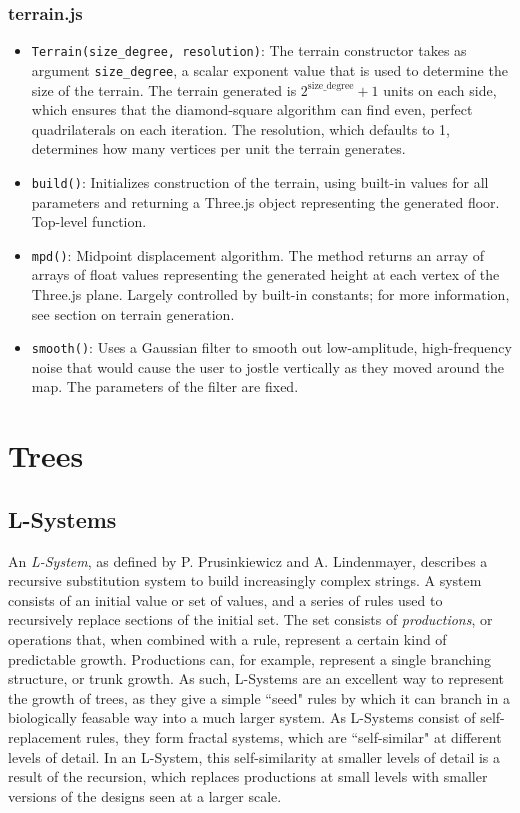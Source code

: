 \documentclass{article}
\newcommand{\tab}{\hspace*{2em}}
\begin{document}
            \subsubsection{terrain.js}
\begin{itemize}
    \item \verb|Terrain(size_degree, resolution)|: The terrain constructor takes as argument
\verb|size_degree|, a scalar exponent value that is used to determine the size of the terrain. The
terrain generated is $2^{\text{size\_degree}}+1$ units on each side, which ensures that the diamond-square
algorithm can find even, perfect quadrilaterals on each iteration. The resolution, which defaults
to 1, determines how many vertices per unit the terrain generates. 

    \item \verb|build()|: Initializes construction of the terrain, using built-in values for all
parameters and returning a Three.js object representing the generated floor. Top-level function.

    \item \verb|mpd()|: Midpoint displacement algorithm. The method
returns an array of arrays of float values representing the generated height at each vertex of the
Three.js plane. Largely controlled by built-in constants; for more information, see section on
terrain generation.

    \item \verb|smooth()|: Uses a Gaussian filter to smooth out low-amplitude, high-frequency noise
that would cause the user to jostle vertically as they moved around the map. The parameters of the
filter are fixed.
\end{itemize}

    \section{Trees}
        \subsection{L-Systems}
    \tab An \emph{L-System}, as defined by P. Prusinkiewicz and A. Lindenmayer\cite{abp96}, describes a
recursive substitution system to build increasingly complex strings. A system consists of an
initial value or set of values, and a series of rules used to recursively replace sections of the
initial set. The set consists of \emph{productions}, or operations that, when combined with a rule,
represent a certain kind of predictable growth. Productions can, for example, represent a single
branching structure, or trunk growth. As such, L-Systems are an excellent way to represent the
growth of trees, as they give a simple ``seed" rules by which it can branch in a biologically
feasable way into a much larger system. As L-Systems consist of self-replacement rules, they
form fractal systems, which are ``self-similar" at different levels of detail. In an L-System,
this self-similarity at smaller levels of detail is a result of the recursion, which replaces
productions at small levels with smaller versions of the designs seen at a larger scale.
\end{document}
